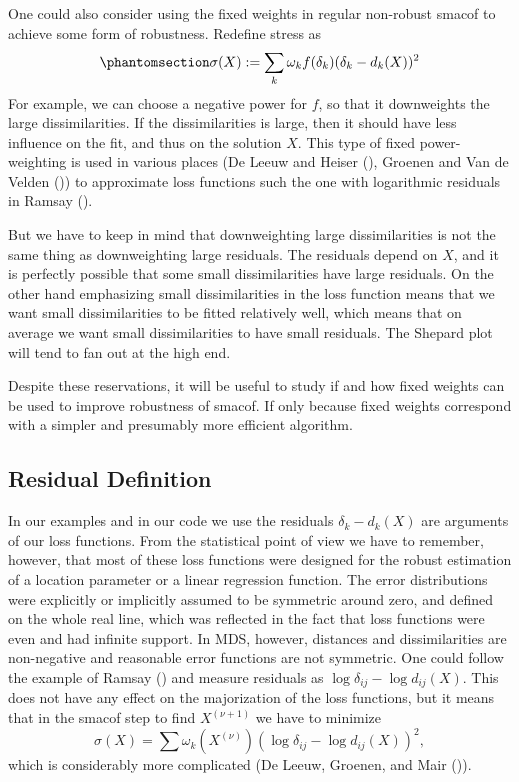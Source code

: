 \documentclass[
  12pt,
  letterpaper,
  DIV=11,
  numbers=noendperiod]{scrartcl}
\theoremstyle{plain}
\theoremstyle{plain}
\theoremstyle{plain}
\theoremstyle{definition}
\theoremstyle{definition}
\theoremstyle{remark}
\begin{document}
One could also consider using the fixed weights in regular non-robust
smacof to achieve some form of robustness. Redefine stress as
\begin{equation}\phantomsection\label{eq-wstress}{
\sigma(X):=\sum_k \omega_kf(\delta_k)(\delta_k-d_k(X))^2
}\end{equation} For example, we can choose a negative power for \(f\),
so that it downweights the large dissimilarities. If the dissimilarities
is large, then it should have less influence on the fit, and thus on the
solution \(X\). This type of fixed power-weighting is used in various
places (De Leeuw and Heiser (),
Groenen and Van de Velden ())
to approximate loss functions such the one with logarithmic residuals in
Ramsay ().

But we have to keep in mind that downweighting large dissimilarities is
not the same thing as downweighting large residuals. The residuals
depend on \(X\), and it is perfectly possible that some small
dissimilarities have large residuals. On the other hand emphasizing
small dissimilarities in the loss function means that we want small
dissimilarities to be fitted relatively well, which means that on
average we want small dissimilarities to have small residuals. The
Shepard plot will tend to fan out at the high end.

Despite these reservations, it will be useful to study if and how fixed
weights can be used to improve robustness of smacof. If only because
fixed weights correspond with a simpler and presumably more efficient
algorithm.

\subsection{Residual Definition}\label{residual-definition}

In our examples and in our code we use the residuals \(\delta_k-d_k(X)\)
are arguments of our loss functions. From the statistical point of view
we have to remember, however, that most of these loss functions were
designed for the robust estimation of a location parameter or a linear
regression function. The error distributions were explicitly or
implicitly assumed to be symmetric around zero, and defined on the whole
real line, which was reflected in the fact that loss functions were even
and had infinite support. In MDS, however, distances and dissimilarities
are non-negative and reasonable error functions are not symmetric. One
could follow the example of Ramsay () and
measure residuals as \(\log\delta_{ij}-\log d_{ij}(X)\). This does not
have any effect on the majorization of the loss functions, but it means
that in the smacof step to find \(X^{(\nu+1)}\) we have to minimize \[
\sigma(X)=\sum \omega_k(X^{(\nu)})(\log\delta_{ij}-\log d_{ij}(X))^2,
\] which is considerably more complicated (De Leeuw, Groenen, and Mair
()).
\end{document}
